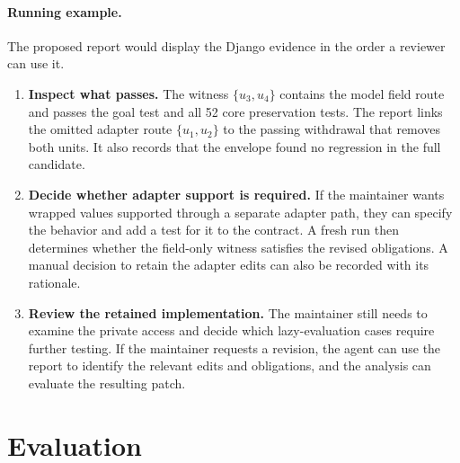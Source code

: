 \documentclass[a4paper,fleqn]{cas-sc}
\newcommand{\code}[1]{\texttt{\detokenize{#1}}}
\begin{document}
\paragraph{Running example.} The proposed report would display the Django evidence in the order a reviewer can use it.
\begin{enumerate}
\item \textbf{Inspect what passes.} The witness $\{u_3,u_4\}$ contains the model field route and passes the goal test and all 52 core preservation tests. The report links the omitted adapter route $\{u_1,u_2\}$ to the passing withdrawal that removes both units. It also records that the envelope found no regression in the full candidate.
\item \textbf{Decide whether adapter support is required.} If the maintainer wants wrapped values supported through a separate adapter path, they can specify the behavior and add a test for it to the contract. A fresh run then determines whether the field-only witness satisfies the revised obligations. A manual decision to retain the adapter edits can also be recorded with its rationale.
\item \textbf{Review the retained implementation.} The maintainer still needs to examine the private \code{_wrapped} access and decide which lazy-evaluation cases require further testing. If the maintainer requests a revision, the agent can use the report to identify the relevant edits and obligations, and the analysis can evaluate the resulting patch.
\end{enumerate}


\section{Evaluation}\label{sec:evaluation}


\end{document}
